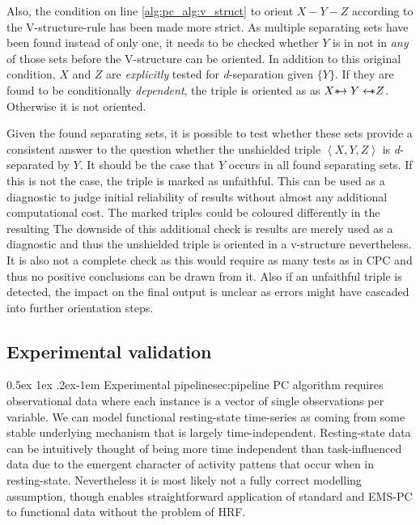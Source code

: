 \documentclass[a4paper, 10pt, english, onecolumn]{article}
\makeatletter
\def \srightarrow {\text{\textasteriskcentered}\hspace{-0.62em}\rightarrow}
\def \sleftarrow {\leftarrow\hspace{-0.62em}\text{\textasteriskcentered}}
\renewcommand{\paragraph}{%
  \@startsection{paragraph}{4}%
  {\z@}{0.5ex \@plus 1ex \@minus .2ex}{-1em}%
  {\normalfont\normalsize\bfseries}%
}
\makeatother
\begin{document}
Also, the condition on line \ref{alg:pc_alg:v_struct} to orient $X - Y - Z$ according to the V-structure-rule has been made more strict.
As multiple separating sets have been found instead of only one, it needs to be checked whether $Y$ is in not in \emph{any} of those sets before the V-structure can be oriented.
In addition to this original condition, $X$ and $Z$ are \textit{explicitly} tested for \textit{d}-separation given $\{Y\}$.
If they are found to be conditionally \textit{dependent}, the triple is oriented as as $X \srightarrow Y \sleftarrow Z$.
Otherwise it is not oriented.

Given the found separating sets, it is possible to test whether these sets provide a consistent answer to the question whether the unshielded triple $\left<X,Y,Z\right>$ is \textit{d}-separated by $Y$.
It should be the case that $Y$ occurs in all found separating sets.
If this is not the case, the triple is marked as unfaithful.
This can be used as a diagnostic to judge initial reliability of results without almost any additional computational cost.
The marked triples could be coloured differently in the resulting 
The downside of this additional check is results are merely used as a diagnostic and thus the unshielded triple is oriented in a v-structure nevertheless.
It is also not a complete check as this would require as many tests as in CPC and thus no positive conclusions can be drawn from it.
Also if an unfaithful triple is detected, the impact on the final output is unclear as errors might have cascaded into further orientation steps.

\subsection{Experimental validation}
\paragraph{Experimental pipeline}{sec:pipeline}
PC algorithm requires observational data where each instance is a vector of single observations per variable.
We can model functional resting-state time-series as coming from some stable underlying mechanism that is largely time-independent.
Resting-state data can be intuitively thought of being more time independent than task-influenced data due to the emergent character of activity pattens that occur when in resting-state.
Nevertheless it is most likely not a fully correct modelling assumption, though enables straightforward application of standard and EMS-PC to functional data without the problem of HRF.
\end{document}
